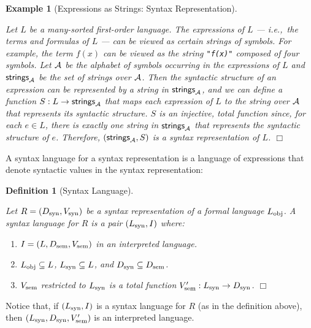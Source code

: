 \documentclass[11pt,fleqn]{article}
\newcommand{\be}{\begin{enumerate}}
\newcommand{\ee}{\end{enumerate}}
\newcommand{\bsp}{\begin{sloppypar}}
\newcommand{\esp}{\end{sloppypar}}
\newcommand{\sA}{\mbox{$\cal A$}}
\newcommand{\mname}[1]{\mbox{\sf #1}}
\newcommand{\tarrow}{\rightarrow}
\newtheorem{eg}[thm]{Example}
\newtheorem{df}[thm]{Definition}
\begin{document}
\begin{eg}[Expressions as Strings: Syntax Representation] \label{eg:strings-a} \em \bsp
Let $L$ be a many-sorted first-order language.  The expressions of $L$
--- i.e.,~the terms and formulas of $L$ --- can be viewed as certain
strings of symbols.  For example, the term $f(x)$ can be viewed as the
string \texttt{"f(x)"} composed of four symbols.  Let $\sA$ be the
alphabet of symbols occurring in the expressions of $L$ and
$\mname{strings}_{\cal A}$ be the set of strings over $\sA$.  Then the
syntactic structure of an expression can be represented by a string in
$\mname{strings}_{\cal A}$, and we can define a function $S : L
\tarrow \mname{strings}_{\cal A}$ that maps each expression of $L$ to
the string over $\sA$ that represents its syntactic structure.  $S$ is
an injective, total function since, for each $e \in L$, there is
exactly one string in $\mname{strings}_{\cal A}$ that represents the
syntactic structure of $e$.  Therefore, $(\mname{strings}_{\cal A},
S)$ is a syntax representation of $L$. \hfill $\Box$ \esp
\end{eg}

A syntax language for a syntax representation is a language of
expressions that denote syntactic values in the syntax representation:

\begin{df}[Syntax Language] \label{df:syn-lang} \em \bsp
Let $R=(D_{\rm syn},V_{\rm syn})$ be a syntax representation of a
formal language $L_{\rm obj}$.  A \emph{syntax language} for $R$ is a pair
$(L_{\rm syn}, I)$ where:

\be

  \item $I = (L,D_{\rm sem},V_{\rm sem})$ in an interpreted language.

  \item $L_{\rm obj}\subseteq L$, $L_{\rm syn} \subseteq L$, and
    $D_{\rm syn} \subseteq D_{\rm sem}$.

  \item $V_{\rm sem}$ restricted to $L_{\rm syn}$ is a total function
    $V'_{\rm sem} : L_{\rm syn} \tarrow D_{\rm syn}$. \hfill $\Box$

\ee
\esp
\end{df}
Notice that, if $(L_{\rm syn}, I)$ is a syntax language for $R$ (as
in the definition above), then $(L_{\rm syn}, D_{\rm syn}, V'_{\rm sem})$ is an
interpreted language.
\end{document}
